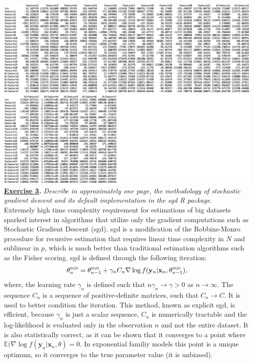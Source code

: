 \documentclass[a4paper, 11pt]{article}
\begin{document}
\newline \includegraphics[scale=0.39]{hessian2.png}\\
\newline \includegraphics[scale=0.39]{hessian3.png}
\newpage
\textbf{\underline{Exercise 3}.} \textit{Describe in approximately one page, the methodology of stochastic gradient descent and its default implementation in the sgd R package.}\\
\newline Extremely high time complexity requirement for estimations of big datasets sparked interest in algorithms that utilize only the gradient computations such as Stochastic Gradient Descent ({\sc sgd}). {\sc sgd} is a modification of the Robbins-Monro procedure for recursive estimation that requires linear time complexity in $N$ and sublinear in $p$, which is much better than traditional estimation algorithms such as the Fisher scoring. {\sc sgd} is defined through the following iteration:
\begin{eqnarray}
\theta_{n}^{\text{{\sc sgd}}} = \theta_{n-1}^{\text{{\sc sgd}}} + \gamma_n C_n \nabla \log f(\mathbf{y}_n | \mathbf{x}_n, \theta_{n-1}^{\text{{\sc sgd}}}), \nonumber
\end{eqnarray}
where, the learning rate $\gamma_n$ is defined such that $n \gamma_n \rightarrow \gamma > 0$ as $n \rightarrow \infty$. The sequence $C_n$ is a sequence of positive-definite matrices, such that $C_n \rightarrow C$. It is used to better condition the iteration. This method, known as explicit {\sc sgd}, is efficient, because $\gamma_n$ is just a scalar sequence, $C_n$ is numerically tractable and the log-likelihood is evaluated only in the observation $n$ and not the entire dataset. It is also statistically correct, as it can be shown that it converges to a point where $\mathbb{E}(\nabla \log f(\mathbf{y}_n | \mathbf{x}_n, \theta) = 0$. In exponential familiy models this point is a unique optimum, so it converges to the true parameter value (it is unbiased).\\
\end{document}
